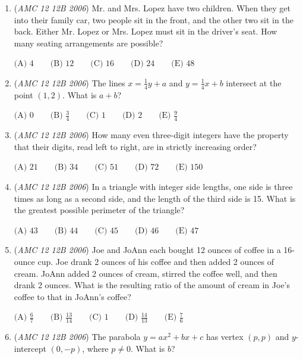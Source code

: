 \begin{enumerate}
 $\text {(A) } 129 \qquad \text {(B) } 137 \qquad \text {(C) } 174 \qquad \text {(D) } 223 \qquad \text {(E) } 411$


	\item (\textit{AMC 12 12B 2006}) Mr. and Mrs. Lopez have two children.  When they get into their family car, two people sit in the front, and the other two sit in the back.  Either Mr. Lopez or Mrs. Lopez must sit in the driver's seat.  How many seating arrangements are possible?


 $\text {(A) } 4 \qquad \text {(B) } 12 \qquad \text {(C) } 16 \qquad \text {(D) } 24 \qquad \text {(E) } 48$


	\item (\textit{AMC 12 12B 2006}) The lines $x = \frac 14y + a$ and $y = \frac 14x + b$ intersect at the point $(1,2)$.  What is $a + b$?


 $\text {(A) } 0 \qquad \text {(B) } \frac 34 \qquad \text {(C) } 1 \qquad \text {(D) } 2 \qquad \text {(E) } \frac 94$


	\item (\textit{AMC 12 12B 2006}) How many even three-digit integers have the property that their digits, read left to right, are in strictly increasing order? 


 $\text {(A) } 21 \qquad \text {(B) } 34 \qquad \text {(C) } 51 \qquad \text {(D) } 72 \qquad \text {(E) } 150$


	\item (\textit{AMC 12 12B 2006}) In a triangle with integer side lengths, one side is three times as long as a second side, and the length of the third side is 15. What is the greatest possible perimeter of the triangle?


 $\text {(A) } 43 \qquad \text {(B) } 44 \qquad \text {(C) } 45 \qquad \text {(D) } 46 \qquad \text {(E) } 47$


	\item (\textit{AMC 12 12B 2006}) Joe and JoAnn each bought 12 ounces of coffee in a 16-ounce cup.  Joe drank 2 ounces of his coffee and then added 2 ounces of cream.  JoAnn added 2 ounces of cream, stirred the coffee well, and then drank 2 ounces.  What is the resulting ratio of the amount of cream in Joe's coffee to that in JoAnn's coffee?


 $\text {(A) } \frac 67 \qquad \text {(B) } \frac {13}{14} \qquad \text {(C) } 1 \qquad \text {(D) } \frac {14}{13} \qquad \text {(E) } \frac 76$


	\item (\textit{AMC 12 12B 2006}) The parabola $y=ax^2+bx+c$ has vertex $(p,p)$ and $y$-intercept $(0,-p)$, where $p\ne 0$. What is $b$?



\end{enumerate}
